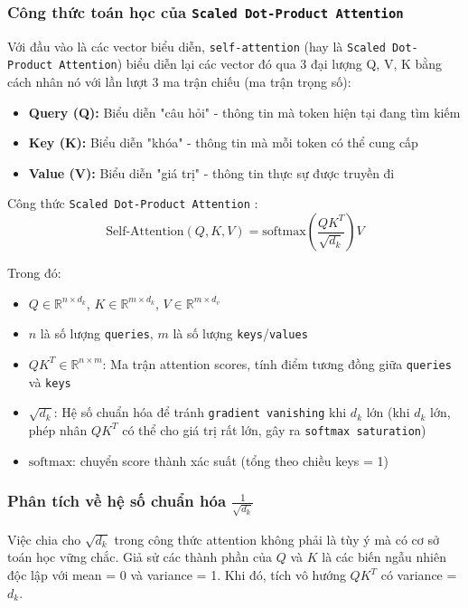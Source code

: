 \subsubsection{Công thức toán học của \texttt{Scaled Dot-Product Attention}}
Với đầu vào là các vector biểu diễn, \texttt{self-attention} (hay là \texttt{Scaled Dot-Product Attention}) biểu diễn lại các vector đó qua 3 đại lượng Q, V, K bằng cách nhân nó với lần lượt 3 ma trận chiếu (ma trận trọng số):
\begin{itemize}
    \item \textbf{Query (Q):} Biểu diễn "câu hỏi" - thông tin mà token hiện tại đang tìm kiếm
    \item \textbf{Key (K):} Biểu diễn "khóa" - thông tin mà mỗi token có thể cung cấp
    \item \textbf{Value (V):} Biểu diễn "giá trị" - thông tin thực sự được truyền đi
\end{itemize}

Công thức \texttt{Scaled Dot-Product Attention} \cite{vaswani2017attention}:
\begin{equation}
\text{Self-Attention}(Q, K, V) = \text{softmax}\left(\frac{QK^T}{\sqrt{d_k}}\right)V
\label{eq:scaled_attention}
\end{equation}

Trong đó:
\begin{itemize}
    \item $Q \in \mathbb{R}^{n \times d_k}$, $K \in \mathbb{R}^{m \times d_k}$, $V \in \mathbb{R}^{m \times d_v}$
    \item $n$ là số lượng \texttt{queries}, $m$ là số lượng \texttt{keys}/\texttt{values}
    \item $QK^T \in \mathbb{R}^{n \times m}$: Ma trận attention scores, tính điểm tương đồng giữa \texttt{queries} và \texttt{keys}
    \item $\sqrt{d_k}$: Hệ số chuẩn hóa để tránh \texttt{gradient vanishing} khi $d_k$ lớn (khi $d_k$ lớn, phép nhân $QK^T$ có thể cho giá trị rất lớn, gây ra \texttt{softmax saturation})
    \item $\text{softmax}$: chuyển score thành xác suất (tổng theo chiều keys = 1)
\end{itemize}

\subsubsection{Phân tích về hệ số chuẩn hóa $\frac{1}{\sqrt{d_k}}$}

Việc chia cho $\sqrt{d_k}$ trong công thức attention không phải là tùy ý mà có cơ sở toán học vững chắc. Giả sử các thành phần của $Q$ và $K$ là các biến ngẫu nhiên độc lập với mean = 0 và variance = 1. Khi đó, tích vô hướng $QK^T$ có variance = $d_k$.

